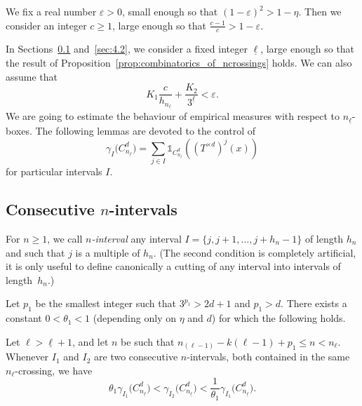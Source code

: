\documentclass[AHL,Unicode,longabstracts]{cedram}
\newcommand{\ind}[1]{\mathds{1}_{#1}}
\newcommand{\cd}{C^{d}}
\newcommand{\td}{T^{\times d}}
\newcommand{\lb}{\underline{\ell}}
\newcommand{\Gam}[1]{\gamma_{#1}\bigl(\cd_{n_{\lb}}\bigr)}
\begin{document}
We fix a real number $\varepsilon>0$, small enough so that $(1-\varepsilon)^2>1-\eta$. Then we consider an integer $c\ge1$, large enough so that $\frac{c-1}{c}>1-\varepsilon$.

In Sections~\ref{sec:4.1} and~\ref{sec:4.2}, we consider a fixed integer $\underline{\ell}$, large enough so that the result of Proposition~\ref{prop:combinatorics_of_ncrossings} holds. We can also assume that
\begin{equation}\label{eq:choice_of_lb}
K_1 \frac{c}{h_{n_{\lb}}} + \frac{K_2}{3^{\lb}} < \varepsilon.
\end{equation}
We are going to estimate the behaviour of empirical measures with respect to $n_{\lb}$-boxes. The following lemmas are devoted to the control of
\[
\Gam{I} = \sum_{j\in I} \ind{\cd_{n_{\lb}}} \left((\td)^j(x)\right)
\]
for particular intervals $I$.

\subsection{Consecutive \texorpdfstring{$n$}{n}-intervals}\label{sec:4.1}

For $n\ge1$, we call \emph{$n$-interval} any interval $I=\{j,j+1,\ldots,j+h_n-1\}$ of length $h_n$ and such that $j$ is a multiple of $h_n$. (The second condition is completely artificial, it is only useful to define canonically a cutting of any interval into intervals of length~$h_n$.)

\begin{lemm}\label{lemma:consecutive_n_intervals}
Let $p_1$ be the smallest integer such that $3^{p_1}>2d+1$ and $p_1>d$. There exists a constant $0<\theta_1<1$ (depending only on $\eta$ and $d$) for which the following holds.

Let $\ell>\lb+1$, and let $n$ be such that $n_{(\ell-1)}-k(\ell-1)+p_1\le n< n_\ell$. Whenever $I_1$ and $I_2$ are two consecutive $n$-intervals, both contained in the same $n_\ell$-crossing, we have
\[
\theta_1 \Gam{I_1} < \Gam{I_2} < \frac{1}{\theta_1} \Gam{I_1}.
\]
\end{lemm}
\end{document}
